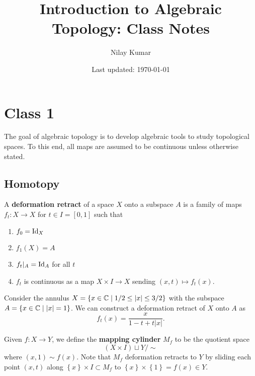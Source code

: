 \documentclass{../mathnotes}
\title{Introduction to Algebraic Topology: Class Notes}
\author{Nilay Kumar}
\date{Last updated: \today}
\begin{document}
\maketitle


\section*{Class 1}
\begin{rem}
    The goal of algebraic topology is to develop algebraic tools to study topological spaces. To this end, all maps are assumed
    to be continuous unless otherwise stated.
\end{rem}

\subsection{Homotopy}

\begin{defn}
    A \textbf{deformation retract} of a space $X$ onto a subspace $A$ is a family of maps
    $f_t:X\to X$ for $t\in I=[0,1]$ such that
    \begin{enumerate}
        \item $f_0=\operatorname{Id}_X$
        \item $f_1(X)=A$
        \item $f_t|_A=\operatorname{Id}_A$ for all $t$
        \item $f_t$ is continuous as a map $X\times I\to X$ sending $(x,t)\mapsto f_t(x)$.
    \end{enumerate}

\end{defn}

\begin{exmp}
    Consider the annulus $X=\left\{ x\in\mathbb{C} \mid 1/2\leq|x|\leq 3/2 \right\}$ with the subspace
    $A=\left\{ x\in\mathbb{C} \mid |x|=1 \right\}$. We can construct a deformation retract of $X$ onto $A$ as
    \[f_t(x)=\frac{x}{1-t+t|x|}.\]
\end{exmp}

\begin{defn}
    Given $f:X\to Y$, we define the \textbf{mapping cylinder} $M_f$ to be the quotient space
    \[(X\times I)\sqcup Y/\sim\]
    where $(x,1)\sim f(x)$. Note that $M_f$ deformation retracts to $Y$ by sliding each point $(x,t)$ along $\left\{ x \right\}\times I\subset M_f$
    to $\left\{ x \right\}\times \left\{ 1 \right\}=f(x)\in Y$.
\end{defn}
\end{document}
